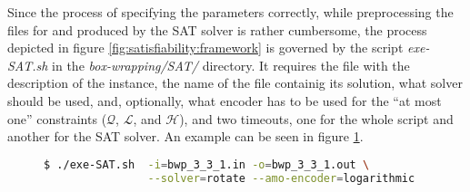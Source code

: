 Since the process of specifying the parameters correctly, while preprocessing the
files for and produced by the SAT solver is rather cumbersome, the process depicted
in figure \ref{fig:satisfiability:framework} is governed by the script \textit{exe-SAT.sh}
in the \textit{box-wrapping/SAT/} directory. It requires the file with the description
of the instance, the name of the file containig its solution, what solver should be
used, and, optionally, what encoder has to be used for the ``at most one'' constraints
($\mathcal{Q}$, $\mathcal{L}$, and $\mathcal{H}$), and two timeouts, one for the whole
script and another for the SAT solver. An example can be seen in figure
\ref{fig:satisfiability:gov-script}.

\begin{figure}[H]
\centering
\begin{lstlisting}[language=bash,basicstyle=\centering]
$ ./exe-SAT.sh	-i=bwp_3_3_1.in -o=bwp_3_3_1.out \
				--solver=rotate	--amo-encoder=logarithmic
\end{lstlisting}
\label{fig:satisfiability:gov-script}
\end{figure}


